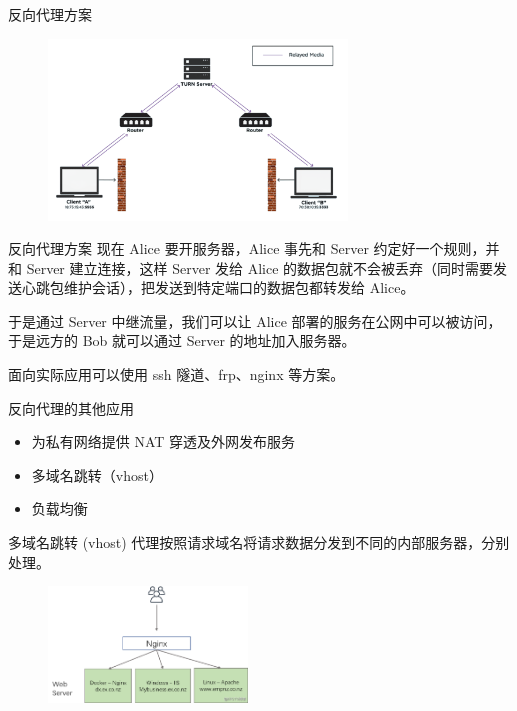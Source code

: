 \begin{xframe}{反向代理方案}
	\begin{figure}[h]
		\includegraphics[width=300px]{2021-04-05_23-46.png}
	\end{figure}
\end{xframe}

\begin{xframe}{反向代理方案}
	现在 Alice 要开服务器，Alice 事先和 Server 约定好一个规则，并和 Server 建立连接，这样 Server 发给 Alice 的数据包就不会被丢弃（同时需要发送心跳包维护会话），把发送到特定端口的数据包都转发给 Alice。\pause
	
	于是通过 Server 中继流量，我们可以让 Alice 部署的服务在公网中可以被访问，于是远方的 Bob 就可以通过 Server 的地址加入服务器。
	
	面向实际应用可以使用 ssh 隧道、frp、nginx 等方案。
\end{xframe}

\begin{xframe}{反向代理的其他应用}
	\begin{itemize}
		\item 为私有网络提供 NAT 穿透及外网发布服务
		\item 多域名跳转（vhost）
%   
		\item 负载均衡
	\end{itemize}
\end{xframe}

\begin{xframe}{多域名跳转 (vhost)}
	代理按照请求域名将请求数据分发到不同的内部服务器，分别处理。
	
	\begin{figure}[h]
		\includegraphics[width=200px]{6629cf9ff020bebc761bf6ba2302552f.png}
	\end{figure}
\end{xframe}

